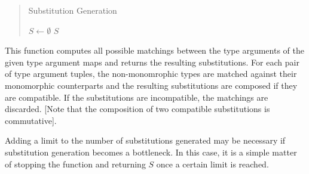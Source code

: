 \documentclass[]{ceurart}
\begin{document}
\begin{quote}
\begin{algorithm}[H]
   \caption{Substitution Generation}

   \BlankLine

   \(S\leftarrow \emptyset\)\;
   \Return \(S\)\;
\end{algorithm}
\end{quote}

This function computes all possible matchings between the type arguments of the given type argument maps and returns the resulting substitutions. For each pair of type argument tuples, the non-monomrophic types are matched against their monomorphic counterparts and the resulting substitutions are composed if they are compatible. If the substitutions are incompatible, the matchings are discarded. [Note that the composition of two compatible substitutions is commutative].

Adding a limit to the number of substitutions generated may be necessary if substitution generation becomes a bottleneck. In this case, it is a simple matter of stopping the function and returning \(S\) once a certain limit is reached.
\end{document}

